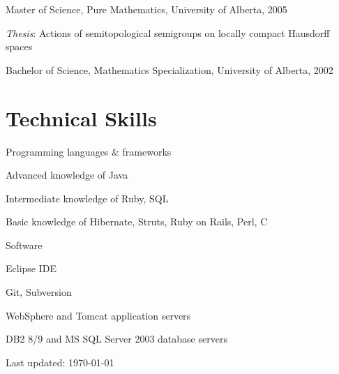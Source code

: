 \documentclass[10.5pt, letterpaper]{article}
\def\footerlink{http://alankydd.files.wordpress.com/2011/01/cv-us.pdf}
\renewenvironment{itemize}{
  \begin{list}{}{
    \setlength{\leftmargin}{1.5em}
  }
}{
  \end{list}
}
\begin{document}
\begin{itemize}
  \item Master of Science, Pure Mathematics, University of Alberta, 2005
    \begin{itemize}
    \item\textit{Thesis}: Actions of semitopological semigroups on locally compact Hausdorff spaces
    \end{itemize}

  \item Bachelor of Science, Mathematics Specialization, University of Alberta, 2002
\end{itemize}

\section*{Technical Skills}
\begin{itemize}
\item Programming languages \& frameworks
  \begin{itemize}
    \item Advanced knowledge of Java
    \item Intermediate knowledge of Ruby, SQL
    \item Basic knowledge of Hibernate, Struts, Ruby on Rails, Perl, C
  \end{itemize}
\begin{comment}
\item Operating Systems
  \begin{itemize}
    \item Advanced knowledge of Windows XP/Server 2003/Vista/7
    \item Intermediate knowledge of Linux and Unix
  \end{itemize}
\end{comment}
\item Software
  \begin{itemize}
    \item Eclipse IDE
    \item Git, Subversion
    \item WebSphere and Tomcat application servers
    \item DB2 8/9 and MS SQL Server 2003 database servers
  \end{itemize}
\end{itemize}
\bigskip

\begin{center}
  \begin{footnotesize}
    Last updated: \today \\
  \end{footnotesize}
\end{center}
\end{document}
